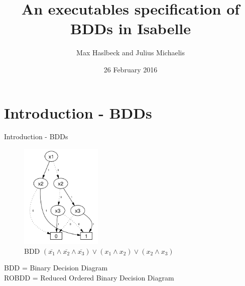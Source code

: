 \documentclass[%
	sans,
	12pt,
]{beamer}
\title{An executables specification of BDDs in Isabelle}
\author{\normalsize Max Haslbeck and Julius Michaelis}
\institute[]{\footnotesize Fakultät für Informatik\\TU München}
\date{\footnotesize 26 February 2016}
\begin{document}
\maketitle


\section{Introduction - BDDs}
\begin{frame}{Introduction - BDDs}
\begin{figure}[htbp]
  \centering
  \includegraphics[height=5cm]{img/BDD_simple.png}
  \caption{BDD $(\overline{x_1} \land \overline{x_2} \land \overline{x_3}) \lor
  (x_1 \land x_2) \lor (x_2 \land x_3) $}
\end{figure}
  BDD = Binary Decision Diagram \\
  ROBDD = Reduced Ordered Binary Decision Diagram
\end{frame}
\end{document}
